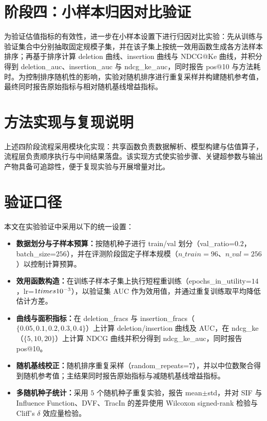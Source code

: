 \section{阶段四：小样本归因对比验证}
为验证估值指标的有效性，进一步在小样本设置下进行归因对比实验：先从训练与验证集合中分别抽取固定规模子集，并在该子集上按统一效用函数生成各方法样本排序；再基于排序计算 deletion 曲线、insertion 曲线与 NDCG@Ke 曲线，并积分得到 deletion\_auc、insertion\_auc 与 ndcg\_ke\_auc，同时报告 pos@10 与方法耗时。为控制排序随机性的影响，实验对随机排序进行重复采样并构建随机参考值，最终同时报告原始指标与相对随机基线增益指标。

\section{方法实现与复现说明}
上述四阶段流程采用模块化实现：共享函数负责数据解析、模型构建与估值算子，流程层负责顺序执行与中间结果落盘。该实现方式使实验步骤、关键超参数与输出产物具备可追踪性，便于复现实验与开展增量对比。

\section{验证口径}
本文在实验验证中采用以下的统一设置：
\begin{itemize}
    \item \textbf{数据划分与子样本预算：}按随机种子进行 train/val 划分（val\_ratio=$0.2$，batch\_size=$256$），并在评测阶段固定子样本规模（$n\_{train}=96$、$n\_{val}=256$）以控制计算预算。
    \item \textbf{效用函数构造：}在训练子样本子集上执行短程重训练（epochs\_in\_utility=$14$，lr=$1\\times10^{-3}$），以验证集 AUC 作为效用值，并通过重复训练取平均降低估计方差。
    \item \textbf{曲线与面积指标：}在 deletion\_fracs 与 insertion\_fracs（$\{0.05,0.1,0.2,0.3,0.4\}$）上计算 deletion/insertion 曲线及 AUC，在 ndcg\_ke（$\{5,10,20\}$）上计算 NDCG 曲线并积分得到 ndcg\_ke\_auc，同时报告 pos@10。
    \item \textbf{随机基线校正：}随机排序重复采样（random\_repeats=$7$），并以中位数聚合得到随机参考值；主结果同时报告原始指标与减随机基线增益指标。
    \item \textbf{多随机种子统计：}采用 $5$ 个随机种子重复实验，报告 mean$\pm$std，并对 SIF 与 Influence Function、DVF、TracIn 的差异使用 Wilcoxon signed-rank 检验与 Cliff's $\delta$ 效应量检验。
\end{itemize}

